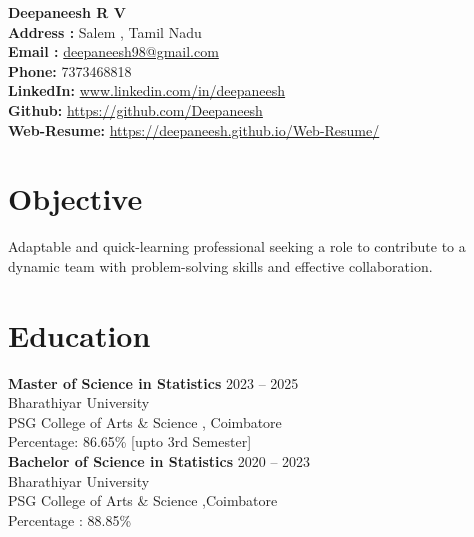\documentclass[a4paper,11pt]{article}
\begin{document}
	
	\begin{flushleft}
		{\LARGE \textbf{Deepaneesh R V}} \\
		\textbf{Address :} Salem , Tamil Nadu \\
		\textbf{Email :} \url{deepaneesh98@gmail.com}\\
		\textbf{Phone:} 7373468818 \\
		\textbf{LinkedIn:} \url{www.linkedin.com/in/deepaneesh} \\
		\textbf{Github:} \url{https://github.com/Deepaneesh} \\
		\textbf{Web-Resume:} \url{https://deepaneesh.github.io/Web-Resume/} \\
	\end{flushleft}
	
	\section*{Objective}
	Adaptable and quick-learning professional seeking a role to contribute to a dynamic team with problem-solving skills and effective collaboration.
	
	\section*{Education}
	\noindent
	\textbf{Master of Science in Statistics} \hfill 2023 -- 2025 \\
	Bharathiyar University \\
	PSG College of Arts \& Science , Coimbatore \\
	Percentage: 86.65\% [upto 3rd Semester] \\[0.1mm]
	
	\textbf{Bachelor of Science in Statistics} \hfill 2020 -- 2023 \\
	Bharathiyar University \\
	PSG College of Arts \& Science ,Coimbatore\\
	Percentage : 88.85\% \\[0.01mm]
	
\end{document}

